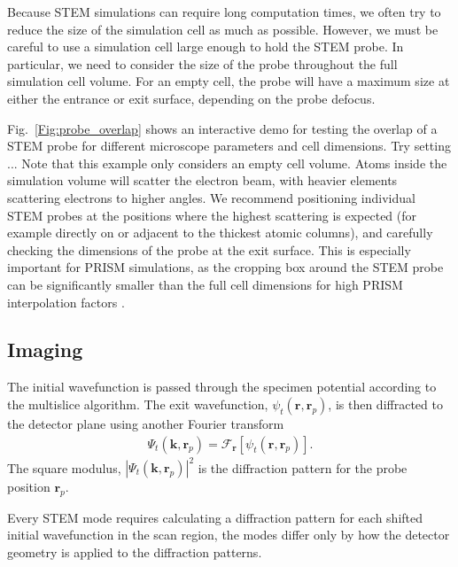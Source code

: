 \documentclass[%
 superscriptaddress,
 aip,
 amsmath,amssymb,
preprint,%
 author-year,%
longbibliography
]{revtex4-2}
\begin{document}
Because STEM simulations can require long computation times, we often try to reduce the size of the simulation cell as much as possible. However, we must be careful to use a simulation cell large enough to hold the STEM probe. In particular, we need to consider the size of the probe throughout the full simulation cell volume. For an empty cell, the probe will have a maximum size at either the entrance or exit surface, depending on the probe defocus. 

Fig.~\ref{Fig:probe_overlap} shows an interactive demo for testing the overlap of a STEM probe for different microscope parameters and cell dimensions.  Try setting ...   Note that this example only considers an empty cell volume. Atoms inside the simulation volume will scatter the electron beam, with heavier elements scattering electrons to higher angles. We recommend positioning individual STEM probes at the positions where the highest scattering is expected (for example directly on or adjacent to the thickest atomic columns), and carefully checking the dimensions of the probe at the exit surface. This is especially important for PRISM simulations, as the cropping box around the STEM probe can be significantly smaller than the full cell dimensions for high PRISM interpolation factors \cite{ophus_fast_2017}.







\subsection*{Imaging}
The initial wavefunction is passed through the specimen potential according to the multislice algorithm. The exit wavefunction, $\psi_t(\bm{r}, \bm{r}_p)$, is then diffracted to the detector plane using another Fourier transform
\begin{align*}
    \Psi_t(\bm{k}, \bm{r}_p) = \mathcal{F}_{\bm{r}} [\psi_t(\bm{r}, \bm{r}_p)] .
\end{align*}
The square modulus, $|\Psi_t(\bm{k}, \bm{r}_p)|^2$ is the diffraction pattern for the probe position $\bm{r}_p$. 

Every STEM mode requires calculating a diffraction pattern for each shifted initial wavefunction in the scan region, the modes differ only by how the detector geometry is applied to the diffraction patterns.
\end{document}
